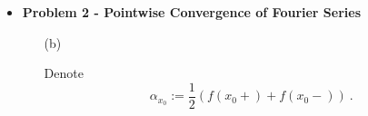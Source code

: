 \documentclass[12pt, reqno]{amsart}
\theoremstyle{definition}
\theoremstyle{remark}
\begin{document}
\begin{itemize}
\begin{itemize}
\begin{proof}
Let $\epsilon>0$ be given and pick $N\in \mathbb{N}$ with $\frac{1}{N}< \epsilon$. If $n\ge N$, $$\|f-f_{n}\|_{\infty}< \frac{1}{n}\le \frac{1}{N}<\epsilon$$So, the sequence of step functions converges to $f$ uniformly on $[0,1]$. By the (PMI), we see that there is a sequence of step functions uniformly converging to all piecewise continuous functions on $[0,1]$. Clearly, periodic extension maintains this property, so it holds for all $f\in\mathcal{PC}_{1}(\mathbb{R};\mathbb{C})$.

\end{proof}

\end{itemize}


\vspace{0.2 cm}

\item {\bf{Problem 2 - Pointwise Convergence of Fourier Series}} 

\begin{itemize}


\vspace{0.1 cm}
\item[(b)] %

Denote
\begin{equation}
\alpha_{x_0} := \frac{1}{2}\left( f(x_0+) + f(x_0-)  \right) ~\mbox{.}
\end{equation}


\end{itemize}
\end{itemize}
\end{document}

